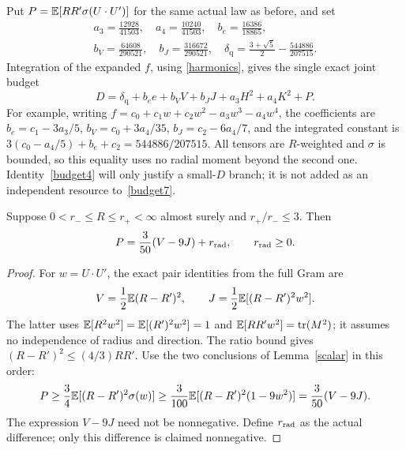 Put $P=\mathbb E[RR'\sigma(U\cdot U')]$ for the same actual law as before, and set
\[
 \begin{gathered}
 a_3=\frac{12928}{41503},\quad a_4=\frac{10240}{41503},\quad
 b_e=\frac{16386}{18865},\\
 b_V=\frac{64608}{290521},\quad b_J=\frac{316672}{290521},\quad
 \delta_{\mathrm q}=\frac{3+\sqrt5}{2}-\frac{544886}{207515}.
 \end{gathered}
\]
Integration of the expanded $f$, using \eqref{harmonics}, gives the single
exact joint budget
\begin{equation}\label{budget7}
 D=\delta_{\mathrm q}+b_e e+b_V V+b_J J+a_3H^2+a_4K^2+P.
\end{equation}
For example, writing $f=c_0+c_1w+c_2w^2-a_3w^3-a_4w^4$,
the coefficients are $b_e=c_1-3a_3/5$, $b_V=c_0+3a_4/35$,
$b_J=c_2-6a_4/7$, and the integrated constant is
$3(c_0-a_4/5)+b_e+c_2=544886/207515$.
All tensors are $R$-weighted and $\sigma$ is bounded, so this equality
uses no radial moment beyond the second one. Identity~\eqref{budget4} will only justify a small-$D$ branch; it is
not added as an independent resource to~\eqref{budget7}.

\begin{lemma}\label{radialpayment}
Suppose $0<r_-\le R\le r_+<\infty$ almost surely and $r_+/r_-\le3$.
Then
\begin{equation}\label{payment}
 P=\frac3{50}(V-9J)+r_{\rm rad},\qquad r_{\rm rad}\ge0.
\end{equation}
\end{lemma}
\begin{proof}
For $w=U\cdot U'$, the exact pair identities from the full Gram are
\[
 V=\frac12\mathbb E(R-R')^2,\qquad
 J=\frac12\mathbb E[(R-R')^2w^2].
\]
The latter uses $\mathbb E[R^2w^2]=\mathbb E[(R')^2w^2]=1$ and
$\mathbb E[RR'w^2]=\operatorname{tr}(M^2)$; it assumes no independence of radius and direction.
The ratio bound gives $(R-R')^2\le(4/3)RR'$. Use the two conclusions
of Lemma~\ref{scalar} in this order:
\[
 P\ge\frac34\mathbb E[(R-R')^2\sigma(w)]
   \ge\frac3{100}\mathbb E[(R-R')^2(1-9w^2)]
    =\frac3{50}(V-9J).
\]
The expression $V-9J$ need not be nonnegative. Define $r_{\rm rad}$
as the actual difference; only this difference is claimed nonnegative.
\end{proof}
